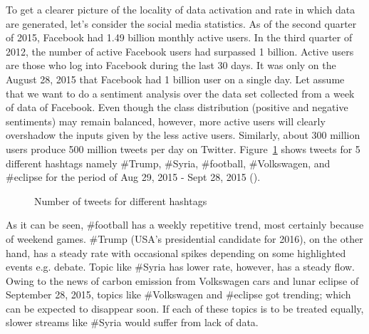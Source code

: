 To get a clearer picture of the locality of data activation and rate in which data are generated, let's consider the social media statistics. As of the second quarter of 2015, Facebook had 1.49 billion monthly active users. In the third quarter of 2012, the number of active Facebook users had surpassed 1 billion. Active users are those who log into Facebook during the last 30 days. It was only on the August 28, 2015 that Facebook had 1 billion user on a single day. Let assume that we want to do a sentiment analysis over the data set collected from a week of data of Facebook. Even though the class distribution (positive and negative sentiments)  may remain balanced, however, more active users will clearly overshadow the inputs given by the less active users. Similarly, about 300 million users produce 500 million tweets per day on Twitter. Figure~\ref{fig:intro:tweets} shows tweets for 5 different hashtags namely \#Trump, \#Syria, \#football, \#Volkswagen, and \#eclipse for the period of Aug 29, 2015 - Sept 28, 2015 (\cite{internet:topsy:tweets}). 
\begin{figure}[htbp] 
    \begin{center}
        \caption{Number of tweets for different hashtags }
        \label{fig:intro:tweets}
    \end{center}
\end{figure}
\noindent As it can be seen, \#football has a weekly repetitive trend, most certainly because of weekend games. \#Trump (USA's presidential candidate for 2016), on the other hand, has a steady rate with occasional spikes depending on some highlighted events e.g. debate. Topic like \#Syria has lower rate, however, has a steady flow. Owing to the news of carbon emission from Volkswagen cars and lunar eclipse of September 28, 2015, topics like \#Volkswagen and \#eclipse got trending; which can be expected to disappear soon. If each of these topics is to be treated equally, slower streams like \#Syria would suffer from lack of data.

